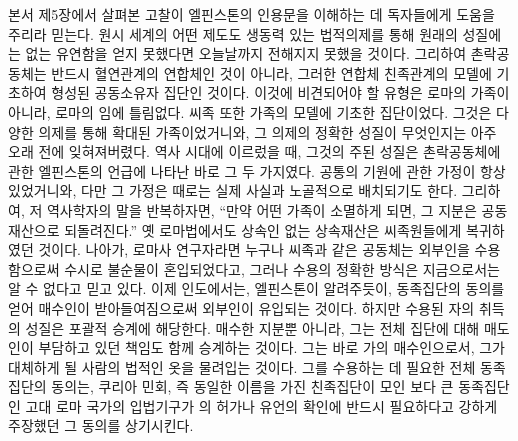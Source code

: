 본서 제5장에서 살펴본 고찰이 엘핀스톤의 인용문을 이해하는 데
독자들에게 도움을 주리라 믿는다.
원시 세계의 어떤 제도도
생동력 있는 법적의제를 통해
원래의 성질에는 없는 유연함을
얻지 못했다면
오늘날까지 전해지지 못했을 것이다.
그리하여 촌락공동체는 반드시 혈연관계의 연합체인 것이 아니라,
그러한 연합체 친족관계의 모델에 기초하여 형성된
공동소유자 집단인 것이다.
이것에 비견되어야 할 유형은 로마의 가족이 아니라,
로마의 임에 틀림없다.
씨족 또한 가족의 모델에 기초한 집단이었다.
그것은 다양한 의제를 통해 확대된 가족이었거니와,
그 의제의 정확한 성질이 무엇인지는 아주 오래 전에 잊혀져버렸다.
역사 시대에 이르렀을 때, 그것의 주된 성질은
촌락공동체에 관한 엘핀스톤의 언급에 나타난 바로 그 두 가지였다.
공통의 기원에 관한 가정이 항상 있었거니와,
다만 그 가정은 때로는 실제 사실과 노골적으로 배치되기도 한다.
그리하여, 저 역사학자의 말을 반복하자면,
``만약 어떤 가족이 소멸하게 되면, 그 지분은 공동재산으로 되돌려진다.''
옛 로마법에서도 상속인 없는 상속재산은
씨족원들에게 복귀하였던 것이다.
나아가, 로마사 연구자라면 누구나
씨족과 같은 공동체는 외부인을 수용함으로써 수시로 불순물이 혼입되었다고,
그러나 수용의 정확한 방식은 지금으로서는 알 수 없다고 믿고 있다.
이제 인도에서는, 엘핀스톤이 알려주듯이,
동족집단의 동의를 얻어 매수인이 받아들여짐으로써
외부인이 유입되는 것이다.
하지만 수용된 자의 취득의 성질은
포괄적 승계에 해당한다.
매수한 지분뿐 아니라,
그는
전체 집단에 대해 매도인이 부담하고 있던 책임도
함께
승계하는 것이다.
그는 바로 가의 매수인으로서,
그가 대체하게 될 사람의 법적인 옷\hanja{[衣服]}을 물려입는 것이다.
그를 수용하는 데 필요한 전체 동족집단의 동의는,
쿠리아 민회, 즉
동일한 이름을 가진 친족집단이 모인 보다 큰 동족집단인 고대 로마 국가의
입법기구가
의 허가나 유언의 확인에 반드시 필요하다고 강하게 주장했던
그 동의를 상기시킨다.

